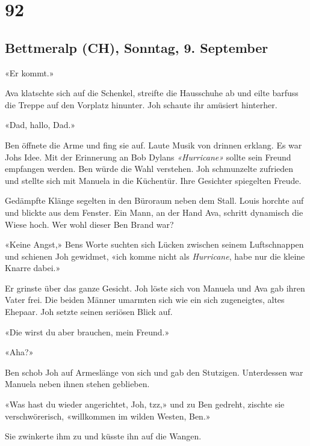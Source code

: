 \chapter{92}

\section{Bettmeralp (CH), Sonntag, 9.
September}



«Er kommt.»

Ava klatschte sich auf die Schenkel, streifte die Hausschuhe ab und
eilte barfuss die Treppe auf den Vorplatz hinunter. Joh schaute ihr amüsiert 
hinterher.

«Dad, hallo, Dad.»

Ben öffnete die Arme und fing sie auf.
Laute Musik von drinnen erklang. Es war Johs Idee. Mit der Erinnerung an
Bob Dylans \emph{«Hurricane»} sollte sein Freund empfangen werden. Ben
würde die Wahl verstehen. Joh schmunzelte zufrieden und stellte sich mit
Manuela in die Küchentür. Ihre Gesichter spiegelten Freude.

Gedämpfte Klänge segelten in den Büroraum neben dem Stall. Louis horchte
auf und blickte aus dem Fenster. Ein Mann, an der Hand Ava, schritt
dynamisch die Wiese hoch. Wer wohl dieser Ben Brand war?


«Keine Angst,» Bens Worte suchten sich Lücken zwischen seinem
Luftschnappen und schienen Joh gewidmet, «ich komme nicht als
\emph{Hurricane}, habe nur die kleine Knarre dabei.»

Er grinste über das ganze Gesicht.
Joh löste sich von Manuela und Ava gab ihren Vater frei. Die beiden
Männer umarmten sich wie ein sich zugeneigtes, altes Ehepaar. Joh
setzte seinen seriösen Blick auf.

«Die wirst du aber brauchen, mein Freund.»

«Aha?»

Ben schob Joh auf Armeslänge von sich und gab den Stutzigen.
Unterdessen war Manuela neben ihnen stehen geblieben.

«Was hast du wieder angerichtet, Joh, tzz,» und zu Ben gedreht, zischte
sie verschwörerisch, «willkommen im wilden Westen, Ben.»

Sie zwinkerte ihm zu und küsste ihn auf die Wangen.

\sectionbreak

